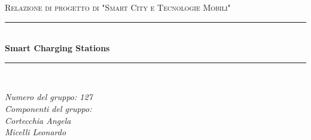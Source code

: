 \documentclass[12pt]{article}
\begin{document}

\begin{titlepage}

  \newcommand{\HRule}{\rule{\linewidth}{0.5mm}}

  \center

  \textsc{\Large Relazione di progetto di "Smart City e Tecnologie Mobili"}\\[0.5cm]

  \HRule \\[0.4cm]
  { \huge \bfseries Smart Charging Stations}\\[0.4cm]
  \HRule \\[1.5cm]

  \vfill

  \begin{flushleft}
    \emph{Numero del gruppo: 127}\\[1cm]
    \emph{Componenti del gruppo:\\Cortecchia Angela\\Micelli Leonardo}\\[3cm]

  \end{flushleft}


\end{titlepage}


\tableofcontents

\newpage
















\end{document}
